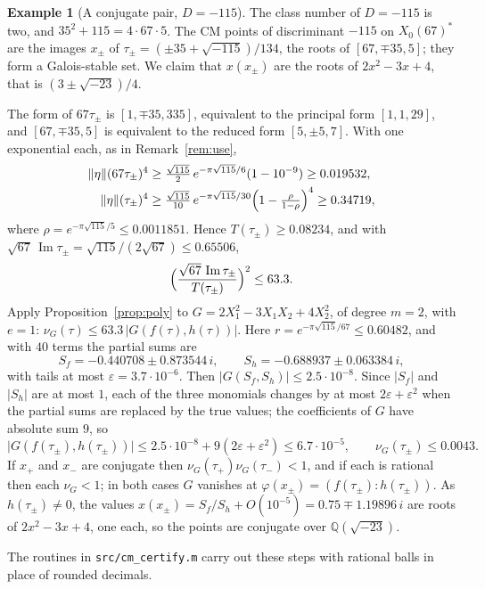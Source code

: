 \documentclass[11pt]{amsart}
\theoremstyle{definition}
\newtheorem{example}[theorem]{Example}
\theoremstyle{remark}
\newcommand{\Q}{\mathbb{Q}}
\newcommand{\im}{\operatorname{Im}}
\newcommand{\etanorm}[1]{\lVert\eta\rVert(#1)}
\begin{document}
\begin{example}[A conjugate pair, $D=-115$]\label{ex:115}
The class number of $D=-115$ is two, and $35^2+115=4\cdot67\cdot5$.  The CM
points of discriminant $-115$ on $X_0(67)^*$ are the images $x_\pm$ of
$\tau_\pm=(\pm35+\sqrt{-115})/134$, the roots of $[67,\mp35,5]$; they form a
Galois-stable set.  We claim that $x(x_\pm)$ are the roots of $2x^2-3x+4$,
that is $(3\pm\sqrt{-23})/4$.

The form of $67\tau_\pm$ is $[1,\mp35,335]$, equivalent to the principal form
$[1,1,29]$, and $[67,\mp35,5]$ is equivalent to the reduced form $[5,\pm5,7]$.
With one exponential each, as in Remark~\ref{rem:use},
\begin{align*}
\etanorm{67\tau_\pm}^4&\ge\tfrac{\sqrt{115}}2\,e^{-\pi\sqrt{115}/6}(1-10^{-9})\ge0.019532,\\
\etanorm{\tau_\pm}^4&\ge\tfrac{\sqrt{115}}{10}\,e^{-\pi\sqrt{115}/30}\Bigl(1-\tfrac{\rho}{1-\rho}\Bigr)^4\ge0.34719,
\end{align*}
where $\rho=e^{-\pi\sqrt{115}/5}\le0.0011851$.  Hence
$T(\tau_\pm)\ge0.08234$, and with $\sqrt{67}\,\im\tau_\pm=\sqrt{115}/(2\sqrt{67})\le0.65506$,
\[
\Bigl(\frac{\sqrt{67}\,\im\tau_\pm}{T(\tau_\pm)}\Bigr)^2\le63.3 .
\]
Apply Proposition~\ref{prop:poly} to $G=2X_1^2-3X_1X_2+4X_2^2$, of degree
$m=2$, with $e=1$: $\nu_G(\tau)\le63.3\,\lvert G(f(\tau),h(\tau))\rvert$.
Here $r=e^{-\pi\sqrt{115}/67}\le0.60482$, and with $40$ terms the partial sums
are
\[
S_f=-0.440708\pm0.873544\,i,\qquad S_h=-0.688937\pm0.063384\,i,
\]
with tails at most $\varepsilon=3.7\cdot10^{-6}$.  Then
$\lvert G(S_f,S_h)\rvert\le2.5\cdot10^{-8}$.  Since
$\lvert S_f\rvert$ and $\lvert S_h\rvert$ are at most $1$, each of the three monomials changes by
at most $2\varepsilon+\varepsilon^2$ when the partial sums are replaced by the
true values; the coefficients of $G$ have absolute sum $9$, so
\[
\lvert G(f(\tau_\pm),h(\tau_\pm))\rvert\le2.5\cdot10^{-8}+9(2\varepsilon+\varepsilon^2)\le6.7\cdot10^{-5},
\qquad\nu_G(\tau_\pm)\le0.0043 .
\]
If $x_+$ and $x_-$ are conjugate then $\nu_G(\tau_+)\nu_G(\tau_-)<1$, and if
each is rational then each $\nu_G<1$; in both cases $G$ vanishes at
$\varphi(x_\pm)=(f(\tau_\pm):h(\tau_\pm))$.  As $h(\tau_\pm)\ne0$, the values
$x(x_\pm)=S_f/S_h+O(10^{-5})=0.75\mp1.19896\,i$ are roots of $2x^2-3x+4$, one
each, so the points are conjugate over $\Q(\sqrt{-23})$.
\end{example}

The routines in \texttt{src/cm\_certify.m} carry out these steps with rational
balls in place of rounded decimals.
\end{document}
